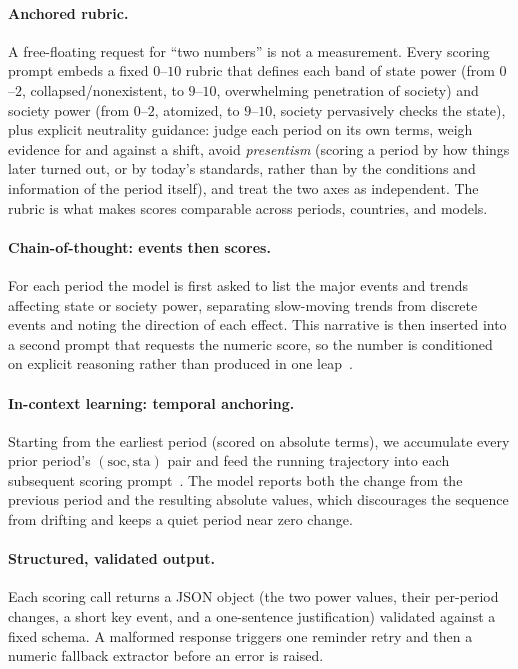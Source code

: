 \documentclass[twocolumn,10pt]{article}
\begin{document}
\paragraph{Anchored rubric.} A free-floating request for ``two numbers'' is not
a measurement. Every scoring prompt embeds a fixed $0$--$10$ rubric that defines
each band of state power (from $0$--$2$, collapsed/nonexistent, to $9$--$10$,
overwhelming penetration of society) and society power (from $0$--$2$, atomized,
to $9$--$10$, society pervasively checks the state), plus explicit neutrality
guidance: judge each period on its own terms, weigh evidence for and against a
shift, avoid \emph{presentism} (scoring a period by how things later turned out,
or by today's standards, rather than by the conditions and information of the
period itself), and treat the two axes as independent. The rubric is
what makes scores comparable across periods, countries, and models.

\paragraph{Chain-of-thought: events then scores.} For each period the model is
first asked to list the major events and trends affecting state or society power,
separating slow-moving trends from discrete events and noting the direction of
each effect. This narrative is then inserted into a second prompt that requests
the numeric score, so the number is conditioned on explicit reasoning rather
than produced in one leap~\citep{wei2022chain}.

\paragraph{In-context learning: temporal anchoring.} Starting from the earliest
period (scored on absolute terms), we accumulate every prior period's
$(\mathrm{soc},\mathrm{sta})$ pair and feed the running trajectory into each
subsequent scoring prompt~\citep{brown2020language}. The model reports both the
change from the previous period and the resulting absolute values, which
discourages the sequence from drifting and keeps a quiet period near zero
change.

\paragraph{Structured, validated output.} Each scoring call returns a JSON
object (the two power values, their per-period changes, a short key event, and
a one-sentence justification) validated against a fixed schema. A malformed
response triggers one reminder retry and then a numeric fallback extractor before
an error is raised.
\end{document}
